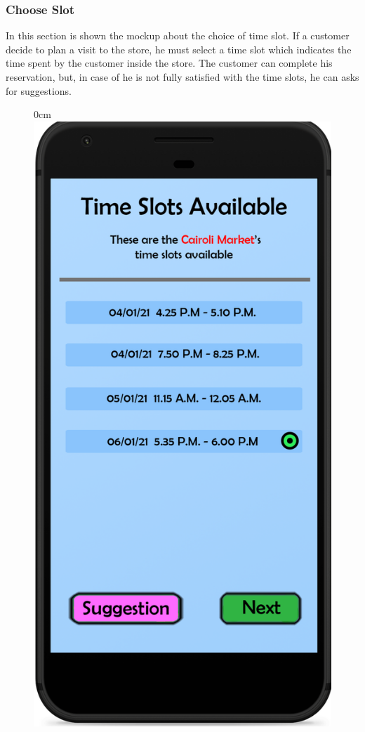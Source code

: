 \documentclass{article}
\begin{document}
		\newpage
		
		\subsubsection{Choose Slot}
		In this section is shown the mockup about the choice of time slot. If a customer decide to plan a visit to the store, he must select a time slot which indicates the time spent by the customer inside the store. The customer can complete his reservation, but, in case of he is not fully satisfied with the time slots, he can asks for suggestions.
		\bigskip
		\bigskip
		\begin{figure}[!h]
			\begin{adjustwidth} {0cm}{}
				\centering
				\includegraphics[scale=0.2]{../Mockups/TimeSlots.png}\\

\end{adjustwidth}
\end{figure}
\end{document}
